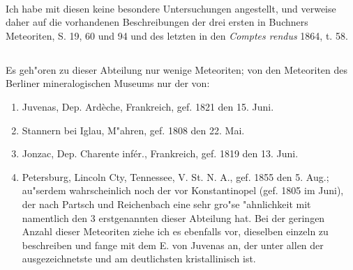 \documentclass[a4paper, 11pt, oneside]{article}
\begin{document}
\paragraph{}
Ich habe mit diesen keine besondere Untersuchungen angestellt, und verweise daher auf die vorhandenen Beschreibungen der drei ersten in Buchners Meteoriten, S. 19, 60 und 94 und des letzten in den \emph{Comptes rendus} 1864, t. 58.
\subsection{}
\paragraph{}
Es geh"oren zu dieser Abteilung nur wenige Meteoriten; von den Meteoriten des Berliner mineralogischen Museums nur der von:
\begin{enumerate}
    \item Juvenas, Dep. Ardèche, Frankreich, gef. 1821 den 15. Juni.
    \item Stannern bei Iglau, M"ahren, gef. 1808 den 22. Mai.
    \item Jonzac, Dep. Charente infér., Frankreich, gef. 1819 den 13. Juni.
    \item Petersburg, Lincoln Cty, Tennessee, V. St. N. A., gef. 1855 den 5. Aug.; au"serdem wahrscheinlich noch der vor Konstantinopel (gef. 1805 im Juni), der nach Partsch und Reichenbach eine sehr gro"se "ahnlichkeit mit namentlich den 3 erstgenannten dieser Abteilung hat. Bei der geringen Anzahl dieser Meteoriten ziehe ich es ebenfalls vor, dieselben einzeln zu beschreiben und fange mit dem E. von Juvenas an, der unter allen der ausgezeichnetste und am deutlichsten kristallinisch ist.
\end{enumerate}
\end{document}
